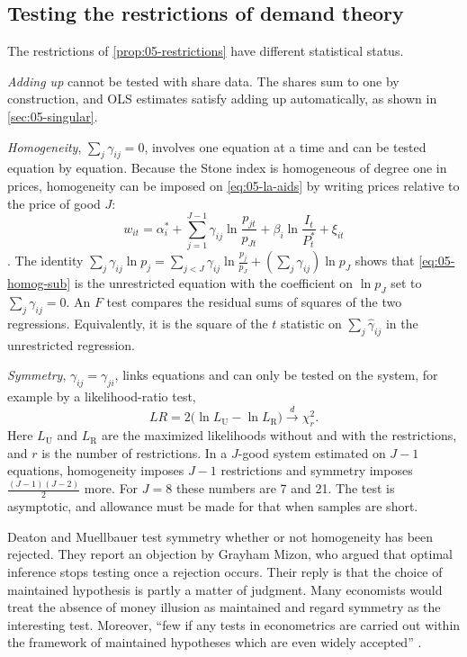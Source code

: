 \subsection{Testing the restrictions of demand theory}\label{sec:05-testing}

The restrictions of \cref{prop:05-restrictions} have different statistical status.

\emph{Adding up} cannot be tested with share data. The shares sum to one by construction, and OLS
estimates satisfy adding up automatically, as shown in \cref{sec:05-singular}.

\emph{Homogeneity}, $\sum_j\gamma_{ij} = 0$, involves one equation at a time and can be tested equation by
equation. Because the Stone index is homogeneous of degree one in prices, homogeneity can be imposed on
\eqref{eq:05-la-aids} by writing prices relative to the price of good $J$:
\begin{equation}\label{eq:05-homog-sub}
  w_{it} = \alpha_i^* + \sum_{j=1}^{J-1}\gamma_{ij}\ln\frac{p_{jt}}{p_{Jt}} + \beta_i\ln\frac{I_t}{P^*_t}
  + \xi_{it}
\end{equation}
\citep[eq.~20]{DeatonMuellbauer1980a}. The identity $\sum_j\gamma_{ij}\ln p_j = \sum_{j<J}\gamma_{ij}
\ln\frac{p_j}{p_J} + (\sum_j\gamma_{ij})\ln p_J$ shows that \eqref{eq:05-homog-sub} is the unrestricted
equation with the coefficient on $\ln p_J$ set to $\sum_j\gamma_{ij} = 0$. An $F$ test compares the
residual sums of squares of the two regressions. Equivalently, it is the square of the $t$ statistic on
$\sum_j\hat\gamma_{ij}$ in the unrestricted regression.

\emph{Symmetry}, $\gamma_{ij} = \gamma_{ji}$, links equations and can only be tested on the system, for
example by a likelihood-ratio test,
\begin{equation*}
  LR = 2\bigl(\ln L_{\mathrm{U}} - \ln L_{\mathrm{R}}\bigr) \xrightarrow{d} \chi^2_r .
\end{equation*}
Here $L_{\mathrm{U}}$ and $L_{\mathrm{R}}$ are the maximized likelihoods without and with the
restrictions, and $r$ is the number of restrictions. In a $J$-good system estimated on $J - 1$ equations, homogeneity
imposes $J - 1$ restrictions and symmetry imposes $\frac{(J-1)(J-2)}{2}$ more. For $J = 8$ these numbers
are 7 and 21. The test is asymptotic, and allowance must be made for that when samples are short.

Deaton and Muellbauer test symmetry whether or not homogeneity has been rejected. They report an
objection by Grayham Mizon, who argued that optimal inference stops testing once a rejection occurs.
Their reply is that the choice of maintained hypothesis is partly a matter of judgment. Many economists
would treat the absence of money illusion as maintained and regard symmetry as the interesting test.
Moreover, ``few if any tests in econometrics are carried out within the framework of maintained hypotheses which
are even widely accepted'' \citep[pp.~318--319]{DeatonMuellbauer1980a}.

